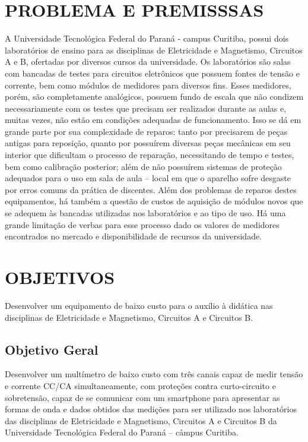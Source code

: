 \section{PROBLEMA E PREMISSSAS}\label{sec:probpremiss}
A Universidade Tecnológica Federal do Paraná - campus Curitiba, possui dois laboratórios de ensino para as disciplinas de Eletricidade e Magnetismo, Circuitos A e B, ofertadas por diversos cursos da universidade. Os laboratórios são salas com bancadas de testes para circuitos eletrônicos que possuem fontes de tensão e corrente, bem como módulos de medidores para diversos fins.
Esses medidores, porém, são completamente analógicos, possuem fundo de escala que não condizem necessariamente com os testes que precisam ser realizados durante as aulas e, muitas vezes, não estão em condições adequadas de funcionamento. Isso se dá em grande parte por sua complexidade de reparos: tanto por precisarem de peças antigas para reposição, quanto por possuírem diversas peças mecânicas em seu interior que dificultam o processo de reparação, necessitando de tempo e testes, bem como calibração posterior; além de não possuírem sistemas de proteção adequados para o uso em sala de aula – local em que o aparelho sofre desgaste por erros comuns da prática de discentes.
Além dos problemas de reparos destes equipamentos, há também a questão de custos de aquisição de módulos novos que se adequem às bancadas utilizadas nos laboratórios e ao tipo de uso. Há uma grande limitação de verbas para esse processo dado os valores de medidores encontrados no mercado e disponibilidade de recursos da universidade.

\section{OBJETIVOS}\label{sec:objetivos}
Desenvolver um equipamento de baixo custo para o auxílio à didática nas disciplinas de Eletricidade e Magnetismo, Circuitos A e Circuitos B.

\subsection{Objetivo Geral}\label{sec:objgeral}
Desenvolver um multímetro de baixo custo com três canais capaz de medir tensão e corrente CC/CA simultaneamente, com proteções contra curto-circuito e sobretensão, capaz de se comunicar com um smartphone para apresentar as formas de onda e dados obtidos das medições para ser utilizado nos laboratórios das disciplinas de Eletricidade e Magnetismo, Circuitos A e Circuitos B da Universidade Tecnológica Federal do Paraná – câmpus Curitiba.


